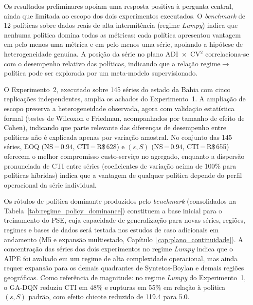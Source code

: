 ﻿


Os resultados preliminares apoiam uma resposta positiva à pergunta central, ainda que limitada ao escopo dos dois experimentos executados. O \textit{benchmark} de 12 políticas sobre dados reais de alta intermitência (regime \textit{Lumpy}) indica que nenhuma política domina todas as métricas: cada política apresentou vantagem em pelo menos uma métrica e em pelo menos uma série, apoiando a hipótese de heterogeneidade genuína. A posição da série no plano ADI~$\times$~CV$^2$ correlaciona-se com o desempenho relativo das políticas, indicando que a relação regime$\rightarrow$política pode ser explorada por um meta-modelo supervisionado.

O Experimento~2, executado sobre 145 séries do estado da Bahia com cinco replicações independentes, amplia os achados do Experimento~1. A ampliação de escopo preserva a heterogeneidade observada, agora com validação estatística formal (testes de Wilcoxon e Friedman, acompanhados por tamanho de efeito de Cohen), indicando que parte relevante das diferenças de desempenho entre políticas não é explicada apenas por variação amostral. No conjunto das 145 séries, EOQ (NS\,=\,$0.94$, CTI\,=\,R\$\,628) e $(s,S)$ (NS\,=\,$0.94$, CTI\,=\,R\$\,655) oferecem o melhor compromisso custo-serviço no agregado, enquanto a dispersão pronunciada de CTI entre séries (coeficientes de variação acima de 100\% para políticas híbridas) indica que a vantagem de qualquer política depende do perfil operacional da série individual.

Os rótulos de política dominante produzidos pelo \textit{benchmark} (consolidados na Tabela~\ref{tab:regime_policy_dominance}) constituem a base inicial para o treinamento do PSE, cuja capacidade de generalização para novas séries, regiões, regimes e bases de dados será testada nos estudos de caso adicionais em andamento (M5 e expansão multiestado, Capítulo~\ref{cap:plano_continuidade}). A concentração das séries dos dois experimentos no regime \textit{Lumpy} indica que o AIPE foi avaliado em um regime de alta complexidade operacional, mas ainda requer expansão para os demais quadrantes de Syntetos-Boylan e demais regiões geográficas. Como referência de magnitude: no regime \textit{Lumpy} do Experimento~1, o GA-DQN reduziu CTI em 48\% e rupturas em 55\% em relação à política $(s,S)$ padrão, com efeito chicote reduzido de 119.4 para 5.0.

